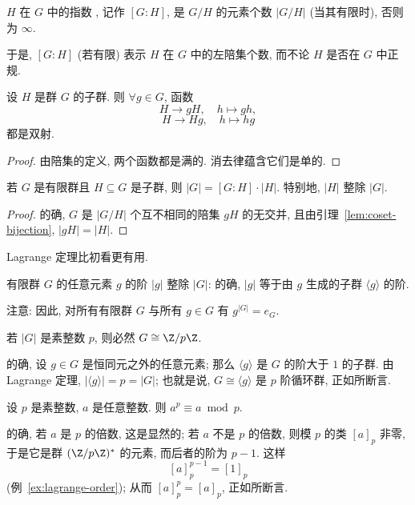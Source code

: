 \begin{definition}
\label{def:index}
$H$ 在 $G$ 中的指数%
, 记作 $[G:H]$, 是 $G/H$ 的元素个数 $|G/H|$ (当其有限时), 否则为 $\infty$.
\end{definition}

于是, $[G:H]$ (若有限) 表示 $H$ 在 $G$ 中的左陪集个数, 而不论 $H$ 是否在 $G$ 中正规.

\begin{lemma}
\label{lem:coset-bijection}
设 $H$ 是群 $G$ 的子群. 则 $\forall g \in G$, 函数
\[
H \rightarrow gH, \quad h \mapsto gh,
\]
\[
H \rightarrow Hg, \quad h \mapsto hg
\]
都是双射.
\end{lemma}

\begin{proof}
由陪集的定义, 两个函数都是满的. 消去律蕴含它们是单的.
\end{proof}

\begin{corollary}[Lagrange 定理]
\label{cor:lagrange}
若 $G$ 是有限群且 $H \subseteq G$ 是子群, 则 $|G| = [G:H] \cdot |H|$. 特别地, $|H|$ 整除 $|G|$.
\end{corollary}

\begin{proof}
的确, $G$ 是 $|G/H|$ 个互不相同的陪集 $gH$ 的无交并, 且由引理~\ref{lem:coset-bijection}, $|gH| = |H|$.
\end{proof}

Lagrange 定理比初看更有用.

\begin{example}
\label{ex:lagrange-order}
有限群 $G$ 的任意元素 $g$ 的阶 $|g|$ 整除 $|G|$: 的确, $|g|$ 等于由 $g$ 生成的子群 $\langle g \rangle$ 的阶.

注意: 因此, 对所有有限群 $G$ 与所有 $g \in G$ 有 $g^{|G|} = e_G$.
\end{example}

\begin{example}
\label{ex:prime-order-cyclic}
若 $|G|$ 是素整数 $p$, 则必然 $G \cong \Z/p\Z$.

的确, 设 $g \in G$ 是恒同元之外的任意元素; 那么 $\langle g \rangle$ 是 $G$ 的阶大于 $1$ 的子群. 由 Lagrange 定理, $|\langle g \rangle| = p = |G|$; 也就是说, $G \cong \langle g \rangle$ 是 $p$ 阶循环群, 正如所断言.
\end{example}

\begin{example}
\label{ex:fermat-little}
设 $p$ 是素整数, $a$ 是任意整数. 则 $a^p \equiv a \bmod p$.

的确, 若 $a$ 是 $p$ 的倍数, 这是显然的; 若 $a$ 不是 $p$ 的倍数, 则模 $p$ 的类 $[a]_p$ 非零, 于是它是群 $(\Z/p\Z)^{*}$ 的元素, 而后者的阶为 $p - 1$. 这样
\[
[a]_p^{p-1} = [1]_p
\]
(例~\ref{ex:lagrange-order}); 从而 $[a]_p^p = [a]_p$, 正如所断言.
\end{example}

